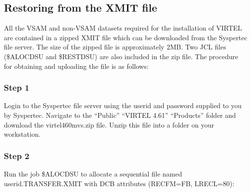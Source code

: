 \documentclass[letterpaper,10pt,english]{sphinxmanual}
\begin{document}
\ignorespaces 

\subsection{Restoring from the XMIT file}
\label{\detokenize{Installation_Guide:restoring-from-the-xmit-file}}\label{\detokenize{Installation_Guide:index-4}}
All the VSAM and non-VSAM datasets required for the installation of VIRTEL are contained in a zipped XMIT file which can be downloaded from the Syspertec file server. The size of the zipped file is approximately 2MB. Two JCL files (\$ALOCDSU and \$RESTDSU) are also     included in the zip file. The procedure for obtaining and uploading the file is as follows:


\subsubsection{Step 1}
\label{\detokenize{Installation_Guide:step-1}}
Login to the Syspertec file server  using the userid and password supplied to you by Syspertec. Navigate to the “Public” \textendash{} “VIRTEL 4.61” \textendash{} “Products” folder and download the virtel460mvs.zip file. Unzip this file into a folder on your workstation.

\newpage


\subsubsection{Step 2}
\label{\detokenize{Installation_Guide:step-2}}
Run the job \$ALOCDSU to allocate a sequential file named userid.TRANSFER.XMIT with DCB attributes (RECFM=FB, LRECL=80):
\end{document}
